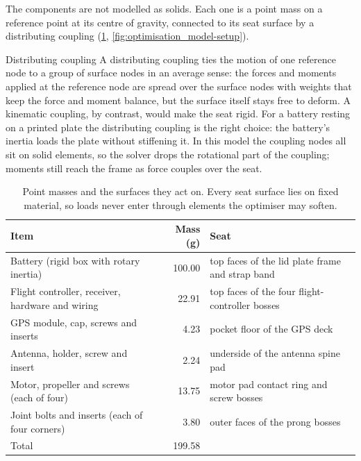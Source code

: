 The components are not modelled as solids. Each one is a point mass on a reference point at its centre of gravity, connected to its seat surface by a distributing coupling (\cref{tab:optimisation_model-masses}, \cref{fig:optimisation_model-setup}).

\begin{theorybox}{Distributing coupling}
A distributing coupling ties the motion of one reference node to a group of surface nodes in an average sense: the forces and moments applied at the reference node are spread over the surface nodes with weights that keep the force and moment balance, but the surface itself stays free to deform. A kinematic coupling, by contrast, would make the seat rigid. For a battery resting on a printed plate the distributing coupling is the right choice: the battery's inertia loads the plate without stiffening it. In this model the coupling nodes all sit on solid elements, so the solver drops the rotational part of the coupling; moments still reach the frame as force couples over the seat.
\end{theorybox}

\begin{table}[htbp]
\centering\small
\caption{Point masses and the surfaces they act on. Every seat surface lies on fixed material, so loads never enter through elements the optimiser may soften.}\label{tab:optimisation_model-masses}
\begin{tabularx}{\linewidth}{@{}lrX@{}}
\toprule
Item & Mass (\si{g}) & Seat\\
\midrule
Battery (rigid box with rotary inertia) & 100.00 & top faces of the lid plate frame and strap band\\
Flight controller, receiver, hardware and wiring & 22.91 & top faces of the four flight-controller bosses\\
GPS module, cap, screws and inserts & 4.23 & pocket floor of the GPS deck\\
Antenna, holder, screw and insert & 2.24 & underside of the antenna spine pad\\
Motor, propeller and screws (each of four) & 13.75 & motor pad contact ring and screw bosses\\
Joint bolts and inserts (each of four corners) & 3.80 & outer faces of the prong bosses\\
\midrule
Total & 199.58 & \\
\bottomrule
\end{tabularx}
\end{table}

